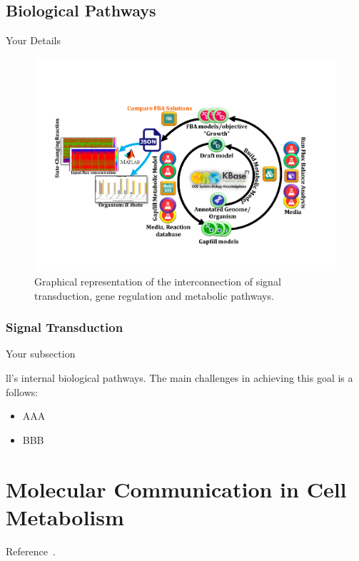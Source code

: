 \documentclass[print,phd_com]{nuthesis}
\begin{document}
\section{Biological Pathways}
\label{sec:biologicalpathways}
\par Your Details
\begin{figure} [H]%
	\begin{center}
		\centering
		\includegraphics[width=\linewidth]{ZSworkflow.pdf}
		\caption{Graphical representation of the interconnection of signal transduction, gene regulation and metabolic pathways.}
		\label{fig:biologicalpathways}
		\vspace{-0.3in}
	\end{center}
\end{figure}

\subsection{Signal Transduction}
\label{subsec:signaltransdution}
\par Your subsection

ll's internal biological pathways. The main challenges in achieving this goal is a follows:
\begin{itemize}
\item AAA
\item BBB
\end{itemize}
\chapter{Molecular Communication in Cell Metabolism}
\label{sec:MCinCellMetabolism}
\par Reference~\cite{gonccalves2013bridging}.
\end{document}
